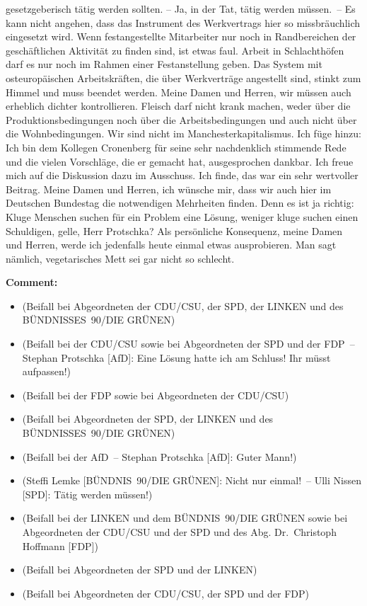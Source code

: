 \documentclass{article}
\begin{document}
gesetzgeberisch tätig werden sollten.  – Ja, in der Tat, tätig werden müssen. – Es kann nicht angehen, dass das Instrument des Werkvertrags hier so missbräuchlich eingesetzt wird.  Wenn festangestellte Mitarbeiter nur noch in Randbereichen der geschäftlichen Aktivität zu finden sind, ist etwas faul. Arbeit in Schlachthöfen darf es nur noch im Rahmen einer Festanstellung geben.  Das System mit osteuropäischen Arbeitskräften, die über Werkverträge angestellt sind, stinkt zum Himmel und muss beendet werden.  Meine Damen und Herren, wir müssen auch erheblich dichter kontrollieren. Fleisch darf nicht krank machen, weder über die Produktionsbedingungen noch über die Arbeitsbedingungen und auch nicht über die Wohnbedingungen. Wir sind nicht im Manchesterkapitalismus.  Ich füge hinzu: Ich bin dem Kollegen Cronenberg für seine sehr nachdenklich stimmende Rede und die vielen Vorschläge, die er gemacht hat, ausgesprochen dankbar. Ich freue mich auf die Diskussion dazu im Ausschuss. Ich finde, das war ein sehr wertvoller Beitrag.  Meine Damen und Herren, ich wünsche mir, dass wir auch hier im Deutschen Bundestag die notwendigen Mehrheiten finden. Denn es ist ja richtig: Kluge Menschen suchen für ein Problem eine Lösung, weniger kluge suchen einen Schuldigen, gelle, Herr Protschka?  Als persönliche Konsequenz, meine Damen und Herren, werde ich jedenfalls heute einmal etwas ausprobieren. Man sagt nämlich, vegetarisches Mett sei gar nicht so schlecht.  

\noindent\textbf{Comment:}
\begin{itemize}
    \setlength\itemsep{-3pt}
    \item (Beifall bei Abgeordneten der CDU/CSU, der SPD, der LINKEN und des BÜNDNISSES 90/DIE GRÜNEN)
    \setlength\itemsep{-3pt}
    \item (Beifall bei der CDU/CSU sowie bei Abgeordneten der SPD und der FDP – Stephan Protschka [AfD]: Eine Lösung hatte ich am Schluss! Ihr müsst aufpassen!)
    \setlength\itemsep{-3pt}
    \item (Beifall bei der FDP sowie bei Abgeordneten der CDU/CSU)
    \setlength\itemsep{-3pt}
    \item (Beifall bei Abgeordneten der SPD, der LINKEN und des BÜNDNISSES 90/DIE GRÜNEN)
    \setlength\itemsep{-3pt}
    \item (Beifall bei der AfD – Stephan Protschka [AfD]: Guter Mann!)
    \setlength\itemsep{-3pt}
    \item (Steffi Lemke [BÜNDNIS 90/DIE GRÜNEN]: Nicht nur einmal! – Ulli Nissen [SPD]: Tätig werden müssen!)
    \setlength\itemsep{-3pt}
    \item (Beifall bei der LINKEN und dem BÜNDNIS 90/DIE GRÜNEN sowie bei Abgeordneten der CDU/CSU und der SPD und des Abg. Dr. Christoph Hoffmann [FDP])
    \setlength\itemsep{-3pt}
    \item (Beifall bei Abgeordneten der SPD und der LINKEN)
    \setlength\itemsep{-3pt}
    \item (Beifall bei Abgeordneten der CDU/CSU, der SPD und der FDP)
\end{itemize}
\end{document}
